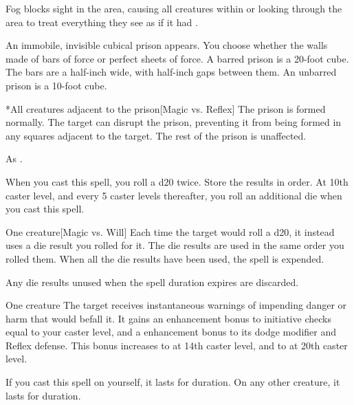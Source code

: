 \spelldur{\durshort}
\spellline
\spelleffect Fog blocks sight in the area, causing all creatures within or looking through the area to treat everything they see as if it had \concealment.
\spellnotes \fogspellnotes

\spellrng{\rngmed}
\spelldur{\durlong \dismissable}
\spellline
\spelleffect An immobile, invisible cubical prison appears. You choose whether the walls made of bars of force or perfect sheets of force. A barred prison is a 20-foot cube. The bars are a half-inch wide, with half-inch gaps between them. An unbarred prison is a 10-foot cube.
\begin{spelltarget}*{All creatures adjacent to the prison}[Magic vs. Reflex]
    \spellsuccess The prison is formed normally.
    \spellfailure The target can disrupt the prison, preventing it from being formed in any squares adjacent to the target. The rest of the prison is unaffected.
\end{spelltarget}
\spellnotes As .

\spellrng{\rngmed}
\spellspecial When you cast this spell, you roll a d20 twice. Store the results in order. At 10th caster level, and every 5 caster levels thereafter, you roll an additional die when you cast this spell.
\begin{spelltarget}{One creature}[Magic vs. Will]
    \spellsuccess Each time the target would roll a d20, it instead uses a die result you rolled for it. The die results are used in the same order you rolled them. When all the die results have been used, the spell is expended.
\end{spelltarget}
\spellnotes Any die results unused when the spell duration expires are discarded.

\begin{spelltarget}{One creature}
    \spelleffect The target receives instantaneous warnings of impending danger or harm that would befall it. It gains an enhancement bonus to initiative checks equal to your caster level, and a  enhancement bonus to its dodge modifier and Reflex defense. This bonus increases to  at 14th caster level, and to  at 20th caster level.
    \par If you cast this spell on yourself, it lasts for \durlong duration. On any other creature, it lasts for \durshort duration.
\end{spelltarget}


